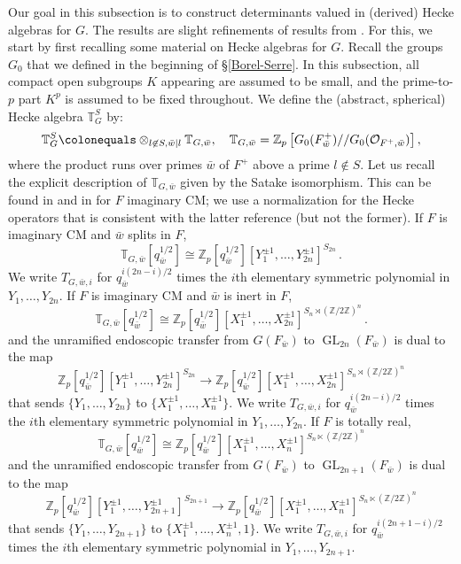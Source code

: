 \documentclass{amsart}
\theoremstyle{remark}
\numberwithin{equation}{subsection}
\newcommand{\Z}{\ZZ}
\newcommand{\TT}{{\mathbb T}}
\newcommand{\ZZ}{{\mathbb Z}}
\newcommand{\cO}{{\mathcal O}}
\DeclareMathOperator{\GL}{GL}
\newcommand{\defeq}{\colonequals}
\renewcommand{\(}{\left(}
\renewcommand{\)}{\right)}
\begin{document}
Our goal in this subsection is to construct determinants valued in (derived) Hecke algebras for $G$. The results are slight refinements of results from \cite{scholze-galois,newton-thorne}. For this, we start by first recalling some material on Hecke algebras for $G$. Recall the groups $G_0$ that we defined in the beginning of \S \ref{Borel-Serre}. In this subsection, all compact open subgroups $K$ appearing are assumed to be small, and the prime-to-$p$ part $K^p$ is assumed to be fixed throughout. We define the (abstract, spherical) Hecke algebra $\TT_G^S$ by:
\[
\mathbb{T}^S_G \defeq \otimes_{l\not\in S, \bar{w}\mid l}\mathbb{T}_{G,\bar{w}}, \quad \mathbb{T}_{G,\bar{w}} = \Z_p\left[G_0(F^+_{\bar{w}})/ /G_0(\cO_{F^+,\bar{w}})\right],
\]
where the product runs over primes $\bar{w}$ of $F^+$ above a prime $l\not\in S$. Let us recall the explicit description of $\TT_{G,\bar{w}}$ given by the Satake isomorphism. This can be found in
\cite[Lem.\ 5.1.6]{scholze-galois} and in
\cite[Prop.-Def. 5.2]{newton-thorne} for $F$ imaginary CM; we use
a normalization for the Hecke operators that is consistent with the latter reference (but not the former). If $F$ is imaginary CM and $\bar{w}$ splits in $F$,
\[ \TT_{G,\bar{w}}[q_{\bar{w}}^{1/2}] \cong \ZZ_p[q_{\bar{w}}^{1/2}][Y_1^{\pm 1},\dotsc,Y_{2n}^{\pm 1}]^{S_{2n}} \,. \]
We write $T_{G,\bar{w},i}$ for $q^{i(2n-i)/2}_{\bar{w}}$ times the $i$th elementary
symmetric polynomial in $Y_1,\dotsc,Y_{2n}$.
If $F$ is imaginary CM and $\bar{w}$ is inert in $F$,
\[  \TT_{G,\bar{w}}[q_{\bar{w}}^{1/2}] \cong \ZZ_p[q_{\bar{w}}^{1/2}][X_1^{\pm 1},\dotsc,X_{2n}^{\pm 1}]^{S_n \rtimes (\ZZ/2\ZZ)^n} \,. \]
and the unramified endoscopic transfer from
$G(F_{\bar{w}})$ to $\GL_{2n}(F_{\bar{w}})$ is dual to the map
\[ \ZZ_p[q_{\bar{w}}^{1/2}][Y_1^{\pm 1},\dotsc,Y_{2n}^{\pm 1}]^{S_{2n}}
\to \ZZ_p[q_{\bar{w}}^{1/2}][X_1^{\pm 1},\dotsc,X_{2n}^{\pm 1}]^{S_n \rtimes (\ZZ/2\ZZ)^n}
\]
that sends $\{Y_1, \dotsc, Y_{2n} \}$ to $\{X_1^{\pm 1}, \dotsc, X_n^{\pm 1} \}$.
We write $T_{G,\bar{w},i}$ for $q^{i(2n-i)/2}_{\bar{w}}$ times the $i$th elementary
symmetric polynomial in $Y_1,\dotsc,Y_{2n}$.
If $F$ is totally real,
\[ \TT_{G,\bar{w}}[q_{\bar{w}}^{1/2}] \cong \ZZ_p[q_{\bar{w}}^{1/2}][X_1^{\pm 1},\dotsc,X_{n}^{\pm 1}]^{S_n \ltimes (\ZZ/2\ZZ)^n} \]
and the unramified endoscopic transfer from $G(F_{\bar{w}})$ to $\GL_{2n+1}(F_{\bar{w}})$ is dual to the map
\[ \ZZ_p[q_{\bar{w}}^{1/2}][Y_1^{\pm 1},\dotsc,Y_{2n+1}^{\pm 1}]^{S_{2n+1}} \to
\ZZ_p[q_{\bar{w}}^{1/2}][X_1^{\pm 1},\dotsc,X_{n}^{\pm 1}]^{S_n \ltimes (\ZZ/2\ZZ)^n} \]
that sends $\{Y_1,\dotsc,Y_{2n+1}\}$ to $\{X_1^{\pm 1},\dotsc,X_n^{\pm 1},1\}$.
We write $T_{G,\bar{w},i}$ for $q^{i(2n+1-i)/2}_{\bar{w}}$ times the $i$th elementary
symmetric polynomial in $Y_1,\dotsc,Y_{2n+1}$.
\end{document}
